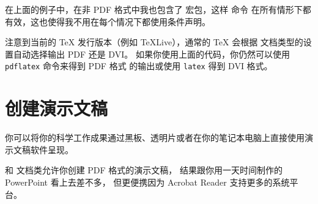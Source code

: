 
在上面的例子中，在非 PDF 格式中我也包含了  宏包，这样  命令
在所有情形下都有效，这也使得我不用在每个情况下都使用条件声明。


注意到当前的 \TeX{} 发行版本（例如 \TeX{}Live），通常的 \TeX{} 会根据
文档类型的设置自动选择输出 PDF 还是 DVI。
如果你使用上面的代码，你仍然可以使用 \verb|pdflatex| 命令来得到 PDF 格式
的输出或使用 \verb|latex| 得到 DVI 格式。


\section{创建演示文稿}
\label{sec:beamer} 


你可以将你的科学工作成果通过黑板、透明片或者在你的笔记本电脑上直接使用演示文稿软件呈现。


 和  文档类允许你创建 PDF 格式的演示文稿，
结果跟你用一天时间制作的 PowerPoint 看上去差不多，
但更便携因为 Acrobat Reader 支持更多的系统平台。



